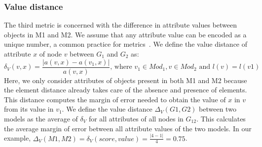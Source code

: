 \subsubsection{Value distance}
The third metric is concerned with the difference in attribute values between objects in M1 and M2.
We assume that any attribute value can be encoded as a unique number, a common practice for metrics~\cite{Bertoa2018}.
We define the value distance of attribute $x$ of node $v$ between $G_1$ and $G_2$ as:
\[
\delta_V(v,x)=\frac{|a(v,x)-a(v_1,x)|}{a(v,x)} \mbox{, where } v_1 \in Mod_1, v \in Mod_2 \mbox{ and } l(v)=l(v1)
\]
Here, we only consider attributes of objects present in both M1 and M2 because the element distance already takes care of the absence and presence of elements.
This distance computes the margin of error needed to obtain the value of $x$ in $v$ from its value in $v_1$.
We define the value distance $\Delta_V(G1,G2)$ between two models as the average of $\delta_V$ for all attributes of all nodes in $G_{12}$.
This calculates the average margin of error between all attribute values of the two models.
In our example, $\Delta_V(M1,M2)=\delta_V(score,value)=\frac{|4-1|}{4}=0.75$.

